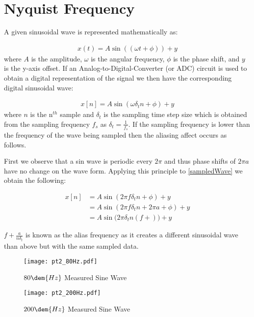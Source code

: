 \documentclass[main.tex]{subfile}
\begin{document}
\section{Nyquist Frequency} 
\label{sec:nyquist_frequency}

A given sinusoidal wave is represented mathematically as:

\begin{align}
  x(t) = A\sin{((\omega t + \phi))} + y
\end{align}
where $A$ is the amplitude, $\omega$ is the angular frequency, $\phi$ is the
phase shift, and $y$ is the y-axis offset. If an Analog-to-Digital-Converter (or
ADC) circuit is used to obtain a digital representation of the signal we then
have the corresponding digital sinusoidal wave: 

\begin{align}
  x[n] = A\sin{(\omega \delta_{t} n + \phi)} + y \label{eq:sampledWave}
\end{align}
where $n$ is the n$^{th}$ sample and $\delta_{t}$ is the sampling time step size
which is obtained from the sampling frequency $f_s$ as $\delta_{t} =
\frac{1}{f_s}$. If the sampling frequency is lower than the frequency of the
wave being sampled then the aliasing affect occurs as follows.

First we observe that a sin wave is periodic every $2\pi$ and thus phase shifts
of $2\pi a$ have no change on the wave form. Applying this principle to \eqref{sampledWave}
we obtain the following:

\begin{align}
  x[n] &= A\sin{(2\pi f \delta_{t} n + \phi)} + y \label{eq:sampledWave}
  \\&= A\sin{(2\pi f \delta_{t} n + 2\pi a + \phi)} + y
  \\&= A\sin{(2\pi \delta_{t} n (f + )}) + y
\end{align}

$f + \frac{a}{n\delta_{t}}$ is known as the alias frequency as it creates a different
sinusoidal wave than above but with the same sampled data.


\begin{figure}[H]
  \begin{center}
    \texttt{[image: pt2\_80Hz.pdf]}
  \end{center}
  \caption{$80\dem{Hz}$ Measured Sine Wave}
  \label{fig:pt280hz}
\end{figure}

\begin{figure}[H]
  \begin{center}
    \texttt{[image: pt2\_200Hz.pdf]}
  \end{center}
  \caption{$200\dem{Hz}$ Measured Sine Wave}
  \label{fig:pt280hz}
\end{figure}
\end{document}
